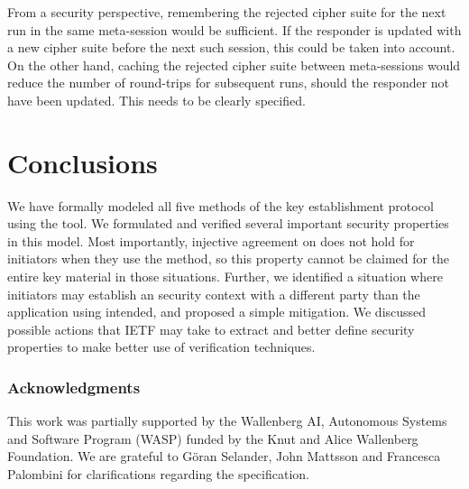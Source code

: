 \documentclass[runningheads, envcountsame, a4paper, draft, x11names]{llncs}
\newcommand{\spacehack}{\vspace{-1em}}
\newcommand{\fillhack}{\vspace{-0.5em}}
\begin{document}
From a security perspective, remembering the rejected cipher suite for the
next \mEdhoc{} run in the same meta-session would be sufficient.
%
If the responder is updated with a new cipher suite before the next such
session, this could be taken into account. On the other hand, caching the
rejected cipher suite between meta-sessions would reduce the number of
round-trips for subsequent runs, should the responder not have been updated.
%
This needs to be clearly specified. 

\spacehack
\section{Conclusions}
\label{sec:conclusions}
\fillhack
We have formally modeled all five
methods of the \mEdhoc{} key establishment protocol using the \mTamarin{} tool.
%
We formulated and verified several important security properties in this model. 
%
%
Most importantly, injective agreement on \mGiy{} does not hold for
initiators when they use the \mStat{} method, so this property cannot be claimed for the entire key material in those situations.
%
Further, we identified a situation where initiators may establish an \mOscore{} security context with a different party than the application using \mEdhoc{} intended, and proposed a simple mitigation.
%
We discussed possible actions that IETF may take to extract and better define security properties to make better use of verification techniques.
%

\spacehack
\subsubsection*{Acknowledgments} This work was partially supported by
the Wallenberg AI, Autonomous Systems and Software Program (WASP) funded by
the Knut and Alice Wallenberg Foundation.
%
We are grateful to G\"oran Selander, John Mattsson and Francesca Palombini for
clarifications regarding the specification.
%
\spacehack


\end{document}
